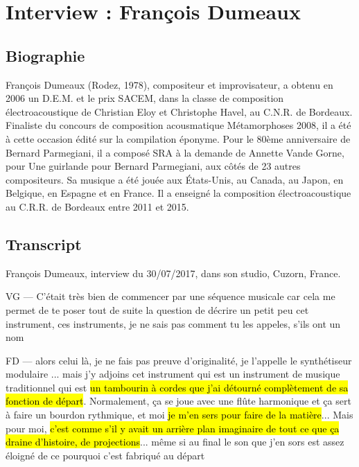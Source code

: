 \chapter{Interview : François Dumeaux}
\label{appendix:dumeaux}

\section*{Biographie}
\noindent François Dumeaux (Rodez, 1978), compositeur et improvisateur, a obtenu en 2006 un D.E.M. et le prix SACEM, dans la classe de composition électroacoustique de Christian Eloy et Christophe Havel, au C.N.R. de Bordeaux. Finaliste du concours de composition acousmatique Métamorphoses 2008, il a été à cette occasion édité sur la compilation éponyme. Pour le 80ème anniversaire de Bernard Parmegiani, il a composé SRA à la demande de Annette Vande Gorne, pour Une guirlande pour Bernard Parmegiani, aux côtés de 23 autres compositeurs. Sa musique a été jouée aux États-Unis, au Canada, au Japon, en Belgique, en Espagne et en France. Il a enseigné la composition électroacoustique au C.R.R. de Bordeaux entre 2011 et 2015.

\section*{Transcript}

\noindent François Dumeaux, interview du 30/07/2017, dans son studio, Cuzorn, France.


VG — C'était très bien de commencer par une séquence musicale car cela me permet de te poser tout de suite la question de décrire un petit peu cet instrument, ces instruments, je ne sais pas comment tu les appeles, s'ils ont un nom 

FD — alors celui là, je ne fais pas preuve d'originalité, je l'appelle le synthétiseur modulaire ... mais j'y adjoins cet instrument qui est un instrument de musique traditionnel qui est \hl{un tambourin à cordes que j'ai détourné complètement de sa fonction de départ}. Normalement, ça se joue avec une flûte harmonique et ça sert à faire un bourdon rythmique, et moi \hl{je m'en sers pour faire de la matière}... Mais pour moi, \hl{c'est comme s'il y avait un arrière plan imaginaire de tout ce que ça draine d'histoire, de projections}... même si au final le son que j'en sors est assez éloigné de ce pourquoi c'est fabriqué au départ 

